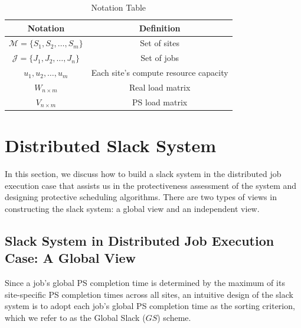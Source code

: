 \begin{table}[tbp]
    \centering
    \caption{Notation Table}
    \label{tab:Notation}
    \begin{tabular}{cc}
        \toprule
        Notation & Definition \\
        \midrule
        $\mathcal M = \{S_1, S_2, \dots, S_m\}$ & Set of sites \\ 
        $\mathcal J = \{J_1, J_2, \dots, J_n\}$ & Set of jobs \\ 
        $u_1, u_2, \dots, u_m$                  & Each site's compute resource capacity \\
        $W_{n\times m}$                         & Real load matrix \\
        $V_{n\times m}$                         & PS load matrix \\
        \bottomrule
    \end{tabular}
\end{table}

\section{Distributed Slack System}
\label{sec:distributed_slack}
In this section, we discuss how to build a slack system in the distributed job execution case that assists us in the protectiveness assessment of the system and designing protective scheduling algorithms. There are two types of views in constructing the slack system: a global view and an independent view.

\subsection{Slack System in Distributed Job Execution Case: A Global View}
Since a job's global PS completion time is determined by the maximum of its site-specific PS completion times across all sites, an intuitive design of the slack system is to adopt each job's global PS completion time as the sorting criterion, which we refer to as the Global Slack ($GS$) scheme.

